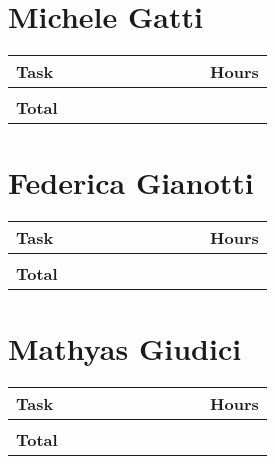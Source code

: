 \section{Michele Gatti}

\smallskip
\begin{center}
\begin{tabular}{ | p{0.75\linewidth} | l | }
  \hline
    \textbf{Task} & \textbf{Hours }\\ \hline
     &  \\ \hline
    \textbf{Total} & \textbf{} \\ \hline
\end{tabular}
\end{center}
\smallskip


\section{Federica Gianotti}

\smallskip
\begin{center}
\begin{tabular}{ | p{0.75\linewidth} | l | }
  \hline
    \textbf{Task} & \textbf{Hours }\\ \hline
    &  \\ \hline
   \textbf{Total} & \textbf{} \\ \hline
\end{tabular}
\end{center}
\smallskip

\section{Mathyas Giudici}

\smallskip
\begin{center}
\begin{tabular}{ | p{0.75\linewidth} | l | }
  \hline
    \textbf{Task} & \textbf{Hours }\\ \hline
    &  \\ \hline
   \textbf{Total} & \textbf{} \\ \hline
\end{tabular}
\end{center}

\clearpage
